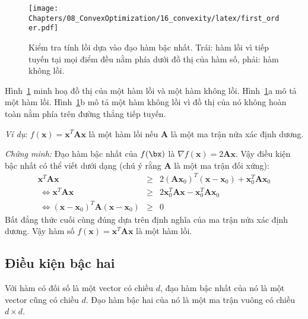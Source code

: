 \begin{figure}[t]
\centering
    \texttt{[image: Chapters/08\_ConvexOptimization/16\_convexity/latex/first\_order.pdf]}
    \caption[]{Kiểm tra tính lồi dựa vào đạo hàm bậc nhất. Trái: hàm lồi vì tiếp tuyến tại mọi điểm đều nằm phía dưới đồ thị của hàm số, phải: hàm không lồi.}
    \label{fig:16_firstorder}
\end{figure}

Hình~\ref{fig:16_firstorder} minh hoạ đồ thị của một hàm lồi và một hàm không
lồi. Hình~\ref{fig:16_firstorder}a mô tả một hàm lồi.
Hình~\ref{fig:16_firstorder}b mô tả một hàm không lồi vì đồ thị của nó không hoàn toàn nằm phía trên đường thẳng tiếp tuyến.
 
\textit{Ví dụ}: $f(\mathbf{x}) = \mathbf{x}^T\mathbf{A}\mathbf{x}$ là một hàm lồi nếu  $\mathbf{A}$ là một ma trận {nửa xác định dương}. 
 
\textit{Chứng minh:} Đạo hàm bậc nhất của $f(\bx)$ là 
\begin{math} 
\nabla f(\mathbf{x}) = 2\mathbf{A} \mathbf{x} 
\end{math}.
Vậy điều kiện bậc nhất có thể viết dưới dạng (chú ý rằng $\mathbf{A}$ là một ma trận đối xứng): 
\begin{eqnarray*} 
\mathbf{x}^T\mathbf{Ax} &\geq& 2(\mathbf{A}\mathbf{x}_0)^T (\mathbf{x} - \mathbf{x}_0) + \mathbf{x}_0^T\mathbf{A}\mathbf{x}_0 \\\ 
\Leftrightarrow \mathbf{x}^T\mathbf{Ax} &\geq& 2\mathbf{x}_0^T\mathbf{A}\mathbf{x} -\mathbf{x}_0^T\mathbf{A}\mathbf{x}_0  \\\ 
\Leftrightarrow (\mathbf{x} - \mathbf{x}_0)^T\mathbf{A}(\mathbf{x} - \mathbf{x}_0) &\geq& 0 
\end{eqnarray*} 
Bất đẳng thức cuối cùng đúng dựa trên định nghĩa của ma trận {nửa xác
định dương}. Vậy hàm số $f(\mathbf{x}) = \mathbf{x}^T\mathbf{A}\mathbf{x}$ là
một {hàm lồi}. \dpcm
 

\subsection{Điều kiện bậc hai}
\index{Hesse -- Hessian}
Với hàm có đối số là một vector có chiều $d$, đạo hàm bậc
nhất của nó là một vector cũng có chiều $d$. Đạo hàm bậc hai của nó là một ma
trận vuông có chiều $d\times d$.

